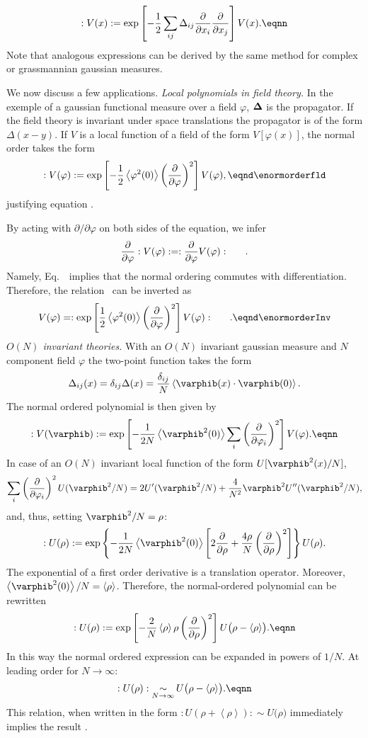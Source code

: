 $$:V(x):=\exp\left[-{ 1\over2}\sum_{ij}\Delta _{ij}{\partial \over\partial x_i}
{\partial \over\partial x_j}\right]V(x).\eqnn $$ Note that
analogous expressions can be derived by the same method for
complex or grassmannian gaussian measures.\par We now discuss a
few applications.
\medskip
{\it  Local polynomials in field theory.} In the exemple of a
gaussian functional measure over a field $\varphi$, $\bf \Delta $
is the propagator. If the field theory is invariant under space
translations the propagator is of the form $\Delta (x-y)$. If $V$
is a local function of a field of the form $V[\varphi(x)]$, the
normal order takes the form
$$ :V(\varphi):= \exp\left[-{ 1\over2} \left<\varphi^2(0)\right> \left( {  \partial \over  \partial \varphi   }\right)^2
 \right]V(\varphi ),\eqnd\enormorderfld $$
justifying equation \eNVnormorder.\par
By acting with $\partial/
\partial \varphi $ on both sides of the equation, we infer
$$  {  \partial \over  \partial \varphi   }
:V(\varphi):= :{  \partial \over  \partial \varphi   }  V(\varphi
):\ \ \ \ \ .$$ Namely, Eq.~\enormorderfld\ implies that the normal
ordering commutes with differentiation. Therefore, the relation
\enormorderfld\ can be inverted as
$$ V(\varphi )=:  \exp\left[ { 1\over2}
\left<\varphi^2(0)\right> \left( {  \partial \over  \partial \varphi   }\right)^2
 \right]  V(\varphi ): \ \ \ \ \ . \eqnd\enormorderInv $$
\smallskip
{\it $O(N)$ invariant theories.} With an $O(N)$ invariant gaussian
measure and $N$ component field $\varphi$ the two-point function
takes the form
 $$\Delta _{ij}(x)=\delta _{ij}\Delta (x)
 ={\delta _{ij}\over N}\left<\varphib(x)\cdot
\varphib(0)\right>.$$ The normal ordered polynomial is then given
by
$$ :V(\varphib):= \exp\left[-{ 1\over2N} \left<\varphib^2(0)\right>\sum_i \left( {  \partial \over  \partial \varphi_i   }\right)^2
 \right]V(\varphi ).\eqnn $$
In case of an $O(N)$ invariant local function of the form
$U[\varphib^2(x)/N]$,
$$\sum_i \left( {  \partial \over  \partial \varphi_i   }\right)^2U(\varphib^2 /N)=
2U'(\varphib^2 /N)+{4\over N^2}\varphib^2 U''(\varphib^2 /N), $$
and, thus, setting $\varphib^2 /N=\rho $:
$$:U(\rho ):=\exp\left\{-{ 1\over2N} \left<\varphib^2(0)\right>
\left[2{\partial \over\partial \rho }+{4\rho \over
N}\left({\partial \over\partial \rho
}\right)^2\right]\right\}U(\rho ). $$ The exponential of a first
order derivative is a translation operator. Moreover,
$\left<\varphib^2(0)\right>/N=\left<\rho \right>$. Therefore, the
normal-ordered polynomial can be rewritten
$$:U(\rho ):=\exp\left[ -{2\over N} \left< \rho \right>\rho
  \left({\partial \over\partial \rho }\right)^2\right] U\bigl(\rho-\left<\rho \right>\bigr ). \eqnn $$
In this way the normal ordered expression can be expanded in
powers of $1/N$. At leading order for $N\to\infty $:
$$:U(\rho ):\mathop{\sim}_{N\to \infty }
 U\bigl(\rho-\left<\rho \right>\bigr ). \eqnn $$
This relation,  when written in the form $:U(\rho+\left<\rho
\right> ):\mathop{\sim}
 U\bigl(\rho)$ immediately implies the
result \eNvarav.


\bye
